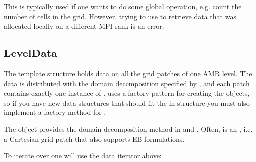 \documentclass[letterpaper,10pt,english]{sphinxmanual}
\begin{document}
\sphinxAtStartPar
This is typically used if one wants to do some global operation, e.g. count the number of cells in the grid.
However, trying to use  to retrieve data that was allocated locally on a different MPI rank is an error.


\subsection{LevelData}
\label{\detokenize{Source/ChomboBasics:leveldata}}
\sphinxAtStartPar
The  template structure holds data on all the grid patches of one AMR level.
The data is distributed with the domain decomposition specified by , and each patch contains exactly one instance of .
 uses a factory pattern for creating the  objects, so if you have new data structures that should fit the in  structure you must also implement a factory method for .

\sphinxAtStartPar
The  object provides the domain decomposition method in  and .
Often,  is an , i.e. a Cartesian grid patch that also supports EB formulations.

\sphinxAtStartPar
To iterate over  one will use the data iterator above:

\begin{sphinxVerbatim}[commandchars=\\\{\},formatcom=\scriptsize]
 
    
     \PYG{p}{[}\PYG{p}{]}
\end{sphinxVerbatim}
\end{document}
